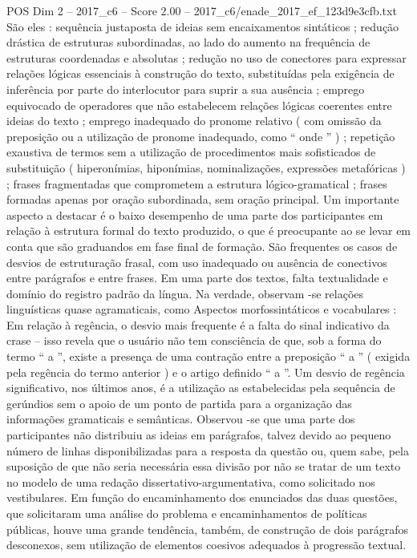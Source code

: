 \begin{textsample}{POS Dim 2 – 2017\_c6 – Score 2.00 – 2017\_c6/enade\_2017\_ef\_123d9e3cfb.txt}
São eles : sequência justaposta de ideias sem encaixamentos sintáticos ; redução drástica de estruturas subordinadas, ao lado do aumento na frequência de estruturas coordenadas e absolutas ; redução no uso de conectores para expressar relações lógicas essenciais à construção do texto, substituídas pela exigência de inferência por parte do interlocutor para suprir a sua ausência ; emprego equivocado de operadores que não estabelecem relações lógicas coerentes entre ideias do texto ; emprego inadequado do pronome relativo ( com omissão da preposição ou a utilização de pronome inadequado, como “ onde ” ) ; repetição exaustiva de termos sem a utilização de procedimentos mais sofisticados de substituição ( hiperonímias, hiponímias, nominalizações, expressões metafóricas ) ; frases fragmentadas que comprometem a estrutura lógico-gramatical ; frases formadas apenas por oração subordinada, sem oração principal.
Um importante aspecto a destacar é o baixo desempenho de uma parte dos participantes em relação à estrutura formal do texto produzido, o que é preocupante ao se levar em conta que são graduandos em fase final de formação.
São frequentes os casos de desvios de estruturação frasal, com uso inadequado ou ausência de conectivos entre parágrafos e entre frases.
Em uma parte dos textos, falta textualidade e domínio do registro padrão da língua.
Na verdade, observam -se relações linguísticas quase agramaticais, como Aspectos morfossintáticos e vocabulares : Em relação à regência, o desvio mais frequente é a falta do sinal indicativo da crase – isso revela que o usuário não tem consciência de que, sob a forma do termo “ a ”, existe a presença de uma contração entre a preposição “ a ” ( exigida pela regência do termo anterior ) e o artigo definido “ a ”.
Um desvio de regência significativo, nos últimos anos, é a utilização as estabelecidas pela sequência de gerúndios sem o apoio de um ponto de partida para a organização das informações gramaticais e semânticas.
Observou -se que uma parte dos participantes não distribuiu as ideias em parágrafos, talvez devido ao pequeno número de linhas disponibilizadas para a resposta da questão ou, quem sabe, pela suposição de que não seria necessária essa divisão por não se tratar de um texto no modelo de uma redação dissertativo-argumentativa, como solicitado nos vestibulares.
Em função do encaminhamento dos enunciados das duas questões, que solicitaram uma análise do problema e encaminhamentos de políticas públicas, houve uma grande tendência, também, de construção de dois parágrafos desconexos, sem utilização de elementos coesivos adequados à progressão textual.

\end{textsample}
